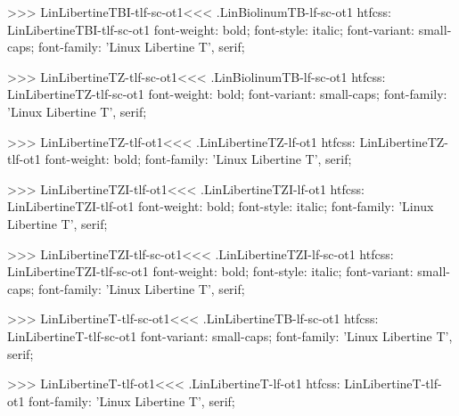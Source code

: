 {{{{{{{>>>
\<LinLibertineTBI-tlf-sc-ot1\><<<
.LinBiolinumTB-lf-sc-ot1
htfcss:  LinLibertineTBI-tlf-sc-ot1  font-weight: bold; font-style: italic; font-variant: small-caps; font-family: 'Linux Libertine T', serif;

>>>
\<LinLibertineTZ-tlf-sc-ot1\><<<
.LinBiolinumTB-lf-sc-ot1
htfcss:  LinLibertineTZ-tlf-sc-ot1  font-weight: bold; font-variant: small-caps; font-family: 'Linux Libertine T', serif;

>>>
\<LinLibertineTZ-tlf-ot1\><<<
.LinLibertineTZ-lf-ot1
htfcss:  LinLibertineTZ-tlf-ot1  font-weight: bold; font-family: 'Linux Libertine T', serif;

>>>
\<LinLibertineTZI-tlf-ot1\><<<
.LinLibertineTZI-lf-ot1
htfcss:  LinLibertineTZI-tlf-ot1  font-weight: bold; font-style: italic; font-family: 'Linux Libertine T', serif;

>>>
\<LinLibertineTZI-tlf-sc-ot1\><<<
.LinLibertineTZI-lf-sc-ot1
htfcss:  LinLibertineTZI-tlf-sc-ot1  font-weight: bold; font-style: italic; font-variant: small-caps; font-family: 'Linux Libertine T', serif;

>>>
\<LinLibertineT-tlf-sc-ot1\><<<
.LinLibertineTB-lf-sc-ot1
htfcss:  LinLibertineT-tlf-sc-ot1  font-variant: small-caps; font-family: 'Linux Libertine T', serif;

>>>
\<LinLibertineT-tlf-ot1\><<<
.LinLibertineT-lf-ot1
htfcss:  LinLibertineT-tlf-ot1  font-family: 'Linux Libertine T', serif;

}}}}}}}
